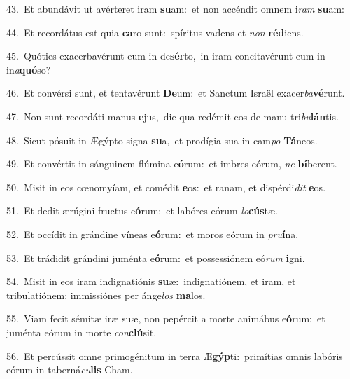 {\numbfont\textcolor{\numbcolor}{43.}}~Et abundávit ut avérteret iram \textbf{su}\-am:~\star et non accéndit omnem i\textit{ram} \textbf{su}\-am:\par
{\numbfont\textcolor{\numbcolor}{44.}}~Et recordátus est quia \textbf{ca}\-ro sunt:~\star spíritus vadens et \textit{non} \textbf{réd}\-iens.\par
{\numbfont\textcolor{\numbcolor}{45.}}~Quóties exacerbavérunt eum in de\-\textbf{sér}\-to,~\star in iram concitavérunt eum in in\-\textit{a}\-\textbf{quó}so?\par
{\numbfont\textcolor{\numbcolor}{46.}}~Et convérsi sunt, et tentavérunt \textbf{De}\-um:~\star et Sanctum Israël exacer\-\textit{ba}\-\textbf{vé}runt.\par
{\numbfont\textcolor{\numbcolor}{47.}}~Non sunt recordáti manus \textbf{e}\-jus,~\star die qua redémit eos de manu tri\-\textit{bu}\-\textbf{lán}tis.\par
{\numbfont\textcolor{\numbcolor}{48.}}~Sicut pósuit in Ægýpto signa \textbf{su}\-a,~\star et prodígia sua in cam\textit{po} \textbf{Tá}\-neos.\par
{\numbfont\textcolor{\numbcolor}{49.}}~Et convértit in sánguinem flúmina e\-\textbf{ó}\-rum:~\star et imbres eórum, \textit{ne} \textbf{bí}\-berent.\par
{\numbfont\textcolor{\numbcolor}{50.}}~Misit in eos cœnomyíam, et comédit \textbf{e}\-os:~\star et ranam, et dispérdi\textit{dit} \textbf{e}\-os.\par
{\numbfont\textcolor{\numbcolor}{51.}}~Et dedit ærúgini fructus e\-\textbf{ó}\-rum:~\star et labóres eórum \textit{lo}\-\textbf{cús}tæ.\par
{\numbfont\textcolor{\numbcolor}{52.}}~Et occídit in grándine víneas e\-\textbf{ó}\-rum:~\star et moros eórum in \textit{pru}\-\textbf{í}na.\par
{\numbfont\textcolor{\numbcolor}{53.}}~Et trádidit grándini juménta e\-\textbf{ó}\-rum:~\star et possessiónem eó\textit{rum} \textbf{i}\-gni.\par
{\numbfont\textcolor{\numbcolor}{54.}}~Misit in eos iram indignatiónis \textbf{su}\-æ:~\star indignatiónem, et iram, et tribulatiónem: immissiónes per ánge\textit{los} \textbf{ma}\-los.\par
{\numbfont\textcolor{\numbcolor}{55.}}~Viam fecit sémitæ iræ suæ, non pepércit a morte animábus e\-\textbf{ó}\-rum:~\star et juménta eórum in morte \textit{con}\-\textbf{clú}sit.\par
{\numbfont\textcolor{\numbcolor}{56.}}~Et percússit omne primogénitum in terra Æ\-\textbf{gýp}\-ti:~\star primítias omnis labóris eórum in taberná\-\textit{cu}\-\textbf{lis} Cham.\par
